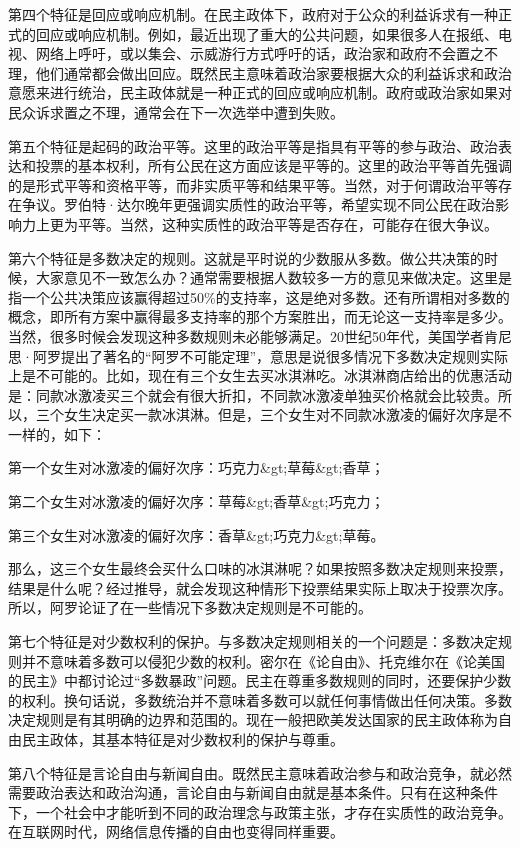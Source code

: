 第四个特征是回应或响应机制。在民主政体下，政府对于公众的利益诉求有一种正式的回应或响应机制。例如，最近出现了重大的公共问题，如果很多人在报纸、电视、网络上呼吁，或以集会、示威游行方式呼吁的话，政治家和政府不会置之不理，他们通常都会做出回应。既然民主意味着政治家要根据大众的利益诉求和政治意愿来进行统治，民主政体就是一种正式的回应或响应机制。政府或政治家如果对民众诉求置之不理，通常会在下一次选举中遭到失败。

第五个特征是起码的政治平等。这里的政治平等是指具有平等的参与政治、政治表达和投票的基本权利，所有公民在这方面应该是平等的。这里的政治平等首先强调的是形式平等和资格平等，而非实质平等和结果平等。当然，对于何谓政治平等存在争议。罗伯特·达尔晚年更强调实质性的政治平等，希望实现不同公民在政治影响力上更为平等。当然，这种实质性的政治平等是否存在，可能存在很大争议。

第六个特征是多数决定的规则。这就是平时说的少数服从多数。做公共决策的时候，大家意见不一致怎么办？通常需要根据人数较多一方的意见来做决定。这里是指一个公共决策应该赢得超过50\%的支持率，这是绝对多数。还有所谓相对多数的概念，即所有方案中赢得最多支持率的那个方案胜出，而无论这一支持率是多少。当然，很多时候会发现这种多数规则未必能够满足。20世纪50年代，美国学者肯尼思·阿罗提出了著名的“阿罗不可能定理”，意思是说很多情况下多数决定规则实际上是不可能的。比如，现在有三个女生去买冰淇淋吃。冰淇淋商店给出的优惠活动是：同款冰激凌买三个就会有很大折扣，不同款冰激凌单独买价格就会比较贵。所以，三个女生决定买一款冰淇淋。但是，三个女生对不同款冰激凌的偏好次序是不一样的，如下：

第一个女生对冰激凌的偏好次序：巧克力&gt;草莓&gt;香草；

第二个女生对冰激凌的偏好次序：草莓&gt;香草&gt;巧克力；

第三个女生对冰激凌的偏好次序：香草&gt;巧克力&gt;草莓。

那么，这三个女生最终会买什么口味的冰淇淋呢？如果按照多数决定规则来投票，结果是什么呢？经过推导，就会发现这种情形下投票结果实际上取决于投票次序。所以，阿罗论证了在一些情况下多数决定规则是不可能的。

第七个特征是对少数权利的保护。与多数决定规则相关的一个问题是：多数决定规则并不意味着多数可以侵犯少数的权利。密尔在《论自由》、托克维尔在《论美国的民主》中都讨论过“多数暴政”问题。民主在尊重多数规则的同时，还要保护少数的权利。换句话说，多数统治并不意味着多数可以就任何事情做出任何决策。多数决定规则是有其明确的边界和范围的。现在一般把欧美发达国家的民主政体称为自由民主政体，其基本特征是对少数权利的保护与尊重。

第八个特征是言论自由与新闻自由。既然民主意味着政治参与和政治竞争，就必然需要政治表达和政治沟通，言论自由与新闻自由就是基本条件。只有在这种条件下，一个社会中才能听到不同的政治理念与政策主张，才存在实质性的政治竞争。在互联网时代，网络信息传播的自由也变得同样重要。

